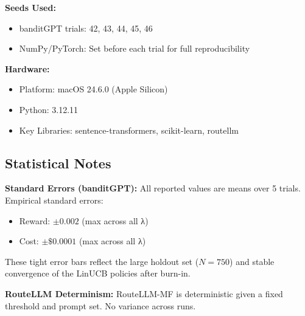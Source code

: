\textbf{Seeds Used:}
\begin{itemize}
    \item banditGPT trials: 42, 43, 44, 45, 46
    \item NumPy/PyTorch: Set before each trial for full reproducibility
\end{itemize}

\textbf{Hardware:}
\begin{itemize}
    \item Platform: macOS 24.6.0 (Apple Silicon)
    \item Python: 3.12.11
    \item Key Libraries: sentence-transformers, scikit-learn, routellm
\end{itemize}

\subsection*{Statistical Notes}

\textbf{Standard Errors (banditGPT):}
All reported values are means over 5 trials. Empirical standard errors:
\begin{itemize}
    \item Reward: $\pm 0.002$ (max across all λ)
    \item Cost: $\pm \$0.0001$ (max across all λ)
\end{itemize}

These tight error bars reflect the large holdout set ($N=750$) and stable convergence of the LinUCB policies after burn-in.

\textbf{RouteLLM Determinism:}
RouteLLM-MF is deterministic given a fixed threshold and prompt set. No variance across runs.



